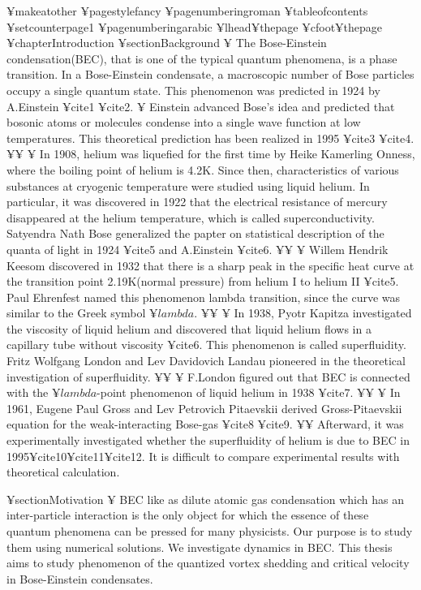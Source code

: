 ¥makeatother
¥pagestyle{fancy}
¥pagenumbering{roman}
¥tableofcontents
¥setcounter{page}{1}
¥pagenumbering{arabic}
¥lhead{¥thepage}
¥cfoot{¥thepage}
¥chapter{Introduction}
¥section{Background}
¥ The Bose-Einstein condensation(BEC), that is one of the typical quantum phenomena,
is a phase transition.
In a Bose-Einstein condensate, a macroscopic number of
Bose particles occupy a single quantum state.
This phenomenon was predicted in 1924 by A.Einstein ¥cite{1} ¥cite{2}.
¥ Einstein advanced Bose's idea and predicted that bosonic atoms or molecules
condense into a single wave function at low temperatures.
This theoretical prediction has been realized in 1995 ¥cite{3} ¥cite{4}.
¥¥
¥ In 1908, helium was liquefied for the first time by Heike Kamerling Onness, 
where the boiling point of helium is 4.2K. 
Since then, characteristics of various substances at cryogenic temperature
were studied using liquid helium. 
In particular, it was discovered in 1922 that the electrical resistance of mercury
disappeared at the helium temperature, which is called superconductivity.
Satyendra Nath Bose generalized the papter on statistical description of the quanta of light in 1924 ¥cite{5} and A.Einstein ¥cite{6}.
¥¥
¥ Willem Hendrik Keesom discovered in 1932 that there is a sharp peak 
in the specific heat curve at the transition point 2.19K(normal pressure) 
from helium I to helium II ¥cite{5}. Paul Ehrenfest named this phenomenon lambda transition,
since the curve was similar to the Greek symbol $¥lambda$.
¥¥
¥ In 1938, Pyotr Kapitza investigated the viscosity of liquid helium and 
discovered that liquid helium flows in a capillary tube without viscosity ¥cite{6}.
This phenomenon is called superfluidity. Fritz Wolfgang London and Lev Davidovich Landau pioneered 
in the theoretical investigation of superfluidity.
¥¥
¥ F.London figured out that BEC is connected with 
the $¥lambda$-point phenomenon of liquid helium in 1938 ¥cite{7}.
¥¥
¥ In 1961, Eugene Paul Gross and Lev Petrovich Pitaevskii derived Gross-Pitaevskii equation for the weak-interacting Bose-gas
¥cite{8} ¥cite{9}.
¥¥ Afterward, it was experimentally investigated whether the superfluidity of helium is due to BEC in 1995¥cite{10}¥cite{11}¥cite{12}.
It is difficult to compare experimental results with theoretical calculation. 

¥section{Motivation}
¥ BEC like as dilute atomic gas condensation which has an inter-particle interaction
is the only object for which the essence of 
these quantum phenomena can be pressed for many physicists.
Our purpose is to study them using numerical solutions.
We investigate dynamics in BEC.
This thesis aims to study phenomenon of the quantized vortex shedding
and critical velocity in Bose-Einstein condensates.

